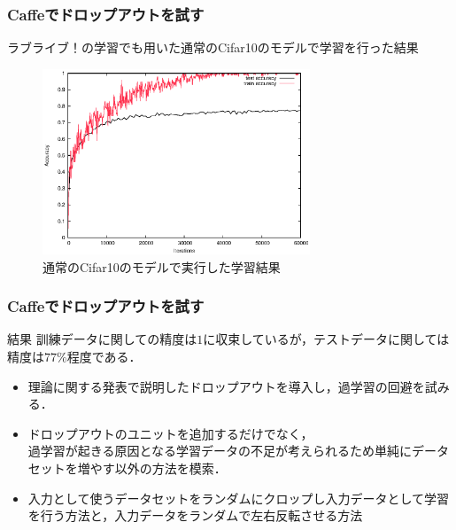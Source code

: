 \documentclass[dvipdfmx,11pt,notheorems]{beamer}
\theoremstyle{definition}
\begin{document}
\begin{frame}[fragile]\frametitle{Caffeでドロップアウトを試す}
ラブライブ！の学習でも用いた通常のCifar10のモデルで学習を行った結果
\begin{figure}[tb]
  \begin{center}
    \includegraphics[clip,width=8cm]{./fig/eps/overtraining.eps}
  \end{center}
  \caption{通常のCifar10のモデルで実行した学習結果}
\end{figure}
\end{frame}

\begin{frame}[fragile]\frametitle{Caffeでドロップアウトを試す}
\begin{alertblock}{結果}
訓練データに関しての精度は$1$に収束しているが，テストデータに関しては精度は$77\%$程度である．
\end{alertblock}
\begin{itemize}
  \item 理論に関する発表で説明したドロップアウトを導入し，過学習の回避を試みる．
  \item ドロップアウトのユニットを追加するだけでなく，\\過学習が起きる原因となる学習データの不足が考えられるため単純にデータセットを増やす以外の方法を模索．
  \item 入力として使うデータセットをランダムにクロップし入力データとして学習を行う方法と，入力データをランダムで左右反転させる方法
\end{itemize}
\end{frame}
\end{document}
